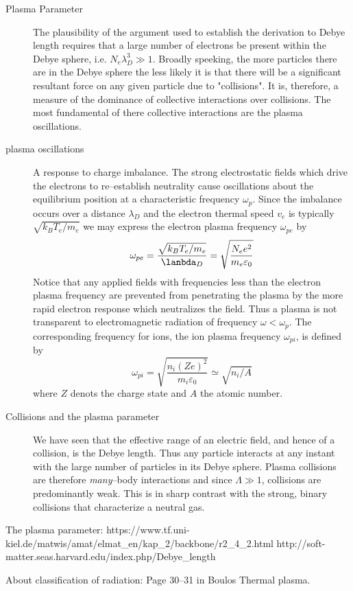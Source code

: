 ﻿\documentclass[openany]{book}
\begin{document}
\begin{description}
\item[Plasma Parameter] The plausibility of the argument used to establish the derivation to Debye length requires that a large number of electrons be present within the Debye sphere, i.e. $N_e \lambda_D^3\gg1$. Broadly speeking, the more particles there are in the Debye sphere the less likely it is that there will be a significant resultant force on any given particle due to "collisions". It is, therefore, a measure of the dominance of collective interactions over collisions. The most fundamental of there collective interactions are the plasma oscillations.
\item[plasma oscillations] A response to charge imbalance. The strong electrostatic fields which drive the electrons to re--establish neutrality cause oscillations about the equilibrium position at a characteristic frequency $\omega_p$. Since the imbalance occurs over a distance $\lambda_D$ and the electron thermal speed $v_e$ is typically $\sqrt{k_B T_e/m_e}$ we may express the electron plasma frequency $\omega_{pe}$ by
$$\omega_{pe}=\frac{\sqrt{k_B T_e/m_e}}{\lanbda_D}=\sqrt{\frac{N_e e^2}{m_e \varepsilon_0}}$$
Notice that any applied fields with frequencies less than the electron plasma frequency are prevented from penetrating the plasma by the more rapid electron response which neutralizes the field. Thus a plasma is not transparent to electromagnetic radiation of frequency $\omega < \omega_p $. The corresponding frequency for ions, the ion plasma frequency $\omega_{pi}$, is defined by 
$$\omega_{pi}=\sqrt{\frac{n_i (Z e)^2}{m_i \varepsilon_0}}\simeq \sqrt{n_i/A}$$
where $Z$ denots the charge state and $A$ the atomic number.
\item[Collisions and the plasma parameter] We have seen that the effective range of an electric field, and hence of a collision, is the Debye length. Thus any particle interacts at any instant with the large number of particles in its Debye sphere. Plasma collisions are therefore \emph{many}--body interactions and since $\Lambda \gg 1$, collisions are predominantly weak. This is in sharp contrast with the strong, binary collisions that characterize a neutral gas.
\end{description}

The plasma parameter:
https://www.tf.uni-kiel.de/matwis/amat/elmat_en/kap_2/backbone/r2_4_2.html
http://soft-matter.seas.harvard.edu/index.php/Debye_length

About classification of radiation:
Page 30--31 in Boulos Thermal plasma.
\end{document}
